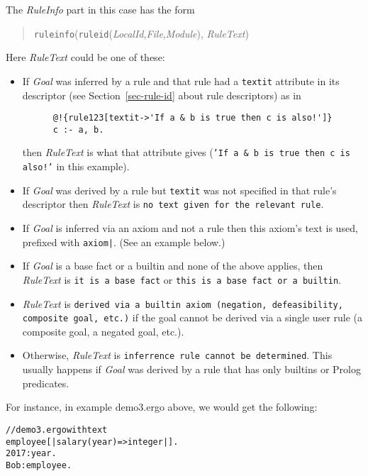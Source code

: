 \begin{itemize}
  The \emph{RuleInfo} part in this case has the form
  \begin{quote}
    \texttt{ruleinfo}(\texttt{ruleid}(\emph{LocalId},\emph{File},\emph{Module}),
    \emph{RuleText})
  \end{quote}
  Here \emph{RuleText} could be one of these:
  \begin{itemize}
  \item  If \emph{Goal} was inferred by a rule and that rule had a
    \texttt{textit} attribute in its descriptor (see
    Section~\ref{sec-rule-id} about rule descriptors) as in
    \label{page-rule-textit}
\begin{verbatim}
      @!{rule123[textit->'If a & b is true then c is also!']}
      c :- a, b.
\end{verbatim}
    then \emph{RuleText} is what that attribute gives (\texttt{'If a \& b
      is true then c is also!'} in this example).
    \label{page-textit}
  \item If \emph{Goal} was derived by a rule but \texttt{textit} was not
    specified in that rule's descriptor then  \emph{RuleText} is
    \texttt{no text given for the relevant rule}. 
  \item If \emph{Goal} is inferred via an axiom and not a rule
    then this axiom's text is used, prefixed with \texttt{axiom|}.
    (See an example below.)
  \item If \emph{Goal} is a base fact or a builtin
    and none of the above applies,
    then  \emph{RuleText} is \texttt{it is a base fact} or \texttt{this is a base fact or a builtin}.
  \item \emph{RuleText} is \texttt{derived via a builtin axiom (negation,
      defeasibility, composite goal, etc.)} if the goal cannot be
    derived via a single user rule (a composite goal, a negated goal, etc.).
  \item Otherwise, \emph{RuleText} is \texttt{inferrence rule cannot be
      determined}. This usually
    happens if \emph{Goal} was derived by a rule that has only builtins or
    Prolog predicates.
  \end{itemize}
    For instance, in example
    demo3.ergo above, we would get the following:
{\small
\begin{alltt}
// demo3.ergo with text
employee[|salary(year)=>\bs{}integer|].
2017:year.
Bob:employee.


\end{alltt}}
\end{itemize}
